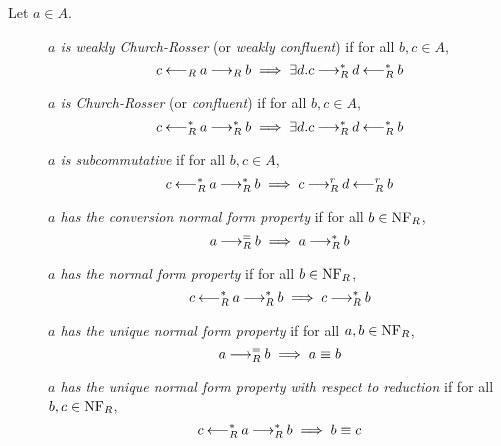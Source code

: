 \begin{definition} Let $a \in A$.
    \begin{description}
        \item[] \emph{$a$ is weakly Church-Rosser} (or \emph{weakly confluent}) if for all $b,c \in A$, \[c \mathbin{\longleftarrow_R} a \mathbin{\longrightarrow_R} b \implies \exists d. c \mathbin{\longrightarrow_R^*} d \mathbin{\longleftarrow_R^*} b\]
        \item[] \emph{$a$ is Church-Rosser} (or \emph{confluent}) if for all $b,c \in A$, \[c \mathbin{\longleftarrow_R^*} a \mathbin{\longrightarrow_R^*} b \implies \exists d. c \mathbin{\longrightarrow_R^*} d \mathbin{\longleftarrow_R^*} b\]
        \item[] \emph{$a$ is subcommutative} if for all $b, c \in A$,
        \[c \mathbin{\longleftarrow_R^*} a \mathbin{\longrightarrow_R^*} b \implies c \mathbin{\longrightarrow_R^r} d \mathbin{\longleftarrow_R^r} b\]
        \item[] \emph{$a$ has the conversion normal form property} if for all $b \in \mathrm{NF}_R$, \[ a \mathbin{\longrightarrow_R^=} b \implies a\mathbin{\longrightarrow_R^*} b\]
        \item[] \emph{$a$ has the normal form property} if for all $b \in \mathrm{NF}_R$,
        \[c \mathbin{\longleftarrow_R^*} a \mathbin{\longrightarrow_R^*} b \implies c \mathbin{\longrightarrow_R^*} b\]
        \item[] \emph{$a$ has the unique normal form property} if for all $a, b \in \mathrm{NF}_R$, \[a \mathbin{\longrightarrow_R^=} b \implies a \equiv b\]
        \item[] \emph{$a$ has the unique normal form property with respect to reduction} if for all $b, c \in \mathrm{NF}_R$,
        \[c \mathbin{\longleftarrow_R^*} a \mathbin{\longrightarrow_R^*} b  \implies b \equiv c\]
    \end{description}
\end{definition}
